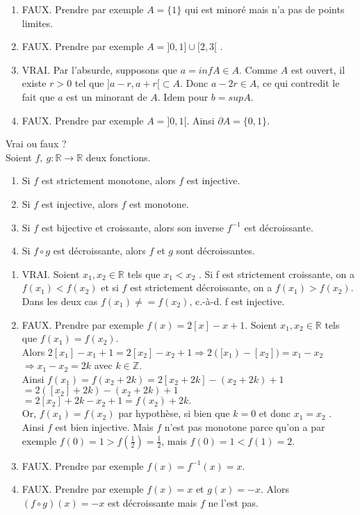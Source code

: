 \documentclass[12pt]{article}
\newcommand*{\xfield}[1]{\begin{mdframed}\centering #1\end{mdframed}\bigskip}
\newenvironment{note}{}{}
\begin{document}
\begin{note}
{\begin{enumerate}
\item FAUX.
Prendre par exemple $A = \{1\}$ qui est minoré mais n’a pas de points limites.\\
\item FAUX.
Prendre par exemple $A = ]0, 1] \cup [2, 3[$ .
\item VRAI.
Par l’absurde, supposons que $a = inf A \in A$. Comme $A$ est ouvert, il existe $r > 0$ tel que
$]a - r, a + r[ \subset A$. Donc $a - 2 r \in A$, ce qui contredit le fait que $a$ est un minorant de $A$.
Idem pour $b = sup A$.\\
\item FAUX.
Prendre par exemple $A = ]0, 1[$. Ainsi $\partial A = \{0, 1\}$.
\end{enumerate} }
\end{note}

\begin{note}
	\xfield{Vrai ou faux ?\\
	Soient $f,\ g : \mathbb{R} \to \mathbb{R}$ deux fonctions.
	\begin{enumerate}
	\item Si $f$ est strictement monotone, alors $f$ est injective.
	\item Si $f$ est injective, alors $f$ est monotone.
	\item Si $f$ est bijective et croissante, alors son inverse $f^{-1}$ est décroissante.
	\item Si $f\circ g$ est décroissante, alors $f$ et $g$ sont décroissantes.
	\end{enumerate} }
	\xfield{\begin{enumerate}
	\item VRAI. Soient $x_1 , x_2 \in \mathbb{R}$ tels que $x_1 < x_2$ . Si f est strictement croissante, on a $f (x_1 ) < f (x_2 )$ et si $f$ est strictement décroissante, on a $f(x_1 ) > f(x_2 )$. Dans les deux cas $f(x_1) \neq = f(x_2)$, c.-à-d. f est injective.
	\item FAUX. Prendre par exemple $f(x) = 2[x] - x + 1$. Soient $x_1 , x_2 \in \mathbb{R}$ tels que $f(x_1 ) = f(x_2 )$.\\
	Alors $2[x_1] - x_1 + 1 = 2[x_2] - x_2 + 1 \Rightarrow 2([x_1)-[x_2]) = x_1 - x_2$\\
	$\Rightarrow x_1 - x_2 = 2k$ avec $k \in \mathbb{Z}$.\\
Ainsi $f(x_1 ) = f(x_2 + 2k) = 2[x_2 + 2k] - (x_2 + 2k) + 1$ \\
$= 2([x_2 ] + 2k) - (x_2 + 2k) + 1$\\
$= 2[x_2 ] + 2k - x_2 + 1 = f(x_2 ) + 2k.$\\
Or, $f(x_1 ) = f(x_2 )$ par hypothèse, si bien que $k = 0$ et donc $x_1 = x_2$ . Ainsi $f$ est bien
injective. Mais $f$ n’est pas monotone parce qu’on a par exemple $f(0) = 1 > f(\frac{1}{2}) = \frac{1}{2}$, mais $f(0) = 1 < f(1) = 2$.
\item FAUX.
Prendre par exemple $f(x) = f^{-1} (x) = x$.
\item FAUX.
Prendre par exemple $f(x) = x$ et $g(x) = -x$. Alors $(f\circ g)(x) = -x$ est décroissante
mais $f$ ne l’est pas.
\end{enumerate}}
\end{note}
\end{document}
